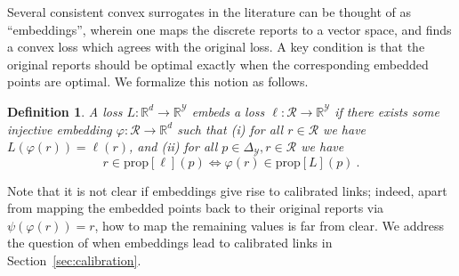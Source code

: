 \documentclass[12pt]{article}
\newcommand{\Comments}{1}
\newcommand{\mynote}[2]{\ifnum\Comments=1\textcolor{#1}{#2}\fi}
\newcommand{\bo}[1]{\mynote{blue}{[Bo: #1]}}
\newcommand{\reals}{\mathbb{R}}
\newcommand{\prop}[1]{\mathrm{prop}[#1]}
\newcommand{\simplex}{\Delta_\Y}
\newcommand{\R}{\mathcal{R}}
\newcommand{\Y}{\mathcal{Y}}
\newcommand{\inprod}[2]{\langle #1, #2 \rangle}%
\DeclareMathOperator*{\argmin}{arg\,min}
\newtheorem{definition}{Definition}
\begin{document}
Several consistent convex surrogates in the literature can be thought of as ``embeddings'', wherein one maps the discrete reports to a vector space, and finds a convex loss which agrees with the original loss.
A key condition is that the original reports should be optimal exactly when the corresponding embedded points are optimal.
We formalize this notion as follows.
%
\begin{definition}\label{def:loss-embed}
  A loss $L:\reals^d\to\reals^\Y$ \emph{embeds} a loss $\ell:\R\to\reals^\Y$ if there exists some injective embedding $\varphi:\R\to\reals^d$ such that
  (i) for all $r\in\R$ we have $L(\varphi(r)) = \ell(r)$, and (ii) for all $p\in\simplex,r\in\R$ we have
  \begin{equation}\label{eq:embed-loss}
    r \in \prop{\ell}(p) \iff \varphi(r) \in \prop{L}(p)~.
  \end{equation}
\end{definition}
%

Note that it is not clear if embeddings give rise to calibrated links; indeed, apart from mapping the embedded points back to their original reports via $\psi(\varphi(r)) = r$, how to map the remaining values is far from clear.
We address the question of when embeddings lead to calibrated links in Section~\ref{sec:calibration}.
\end{document}
